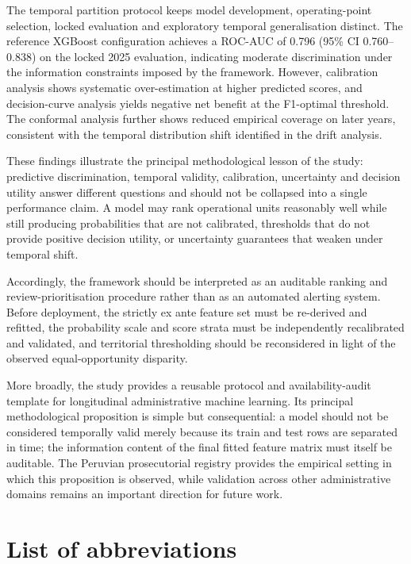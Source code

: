 \documentclass[sn-vancouver,Numbered]{sn-jnl}
\begin{document}
The temporal partition protocol keeps model development, operating-point selection, locked evaluation and exploratory temporal generalisation distinct. The reference XGBoost configuration achieves a ROC-AUC of 0.796 (95\% CI 0.760--0.838) on the locked 2025 evaluation, indicating moderate discrimination under the information constraints imposed by the framework. However, calibration analysis shows systematic over-estimation at higher predicted scores, and decision-curve analysis yields negative net benefit at the F1-optimal threshold. The conformal analysis further shows reduced empirical coverage on later years, consistent with the temporal distribution shift identified in the drift analysis.

These findings illustrate the principal methodological lesson of the study: predictive discrimination, temporal validity, calibration, uncertainty and decision utility answer different questions and should not be collapsed into a single performance claim. A model may rank operational units reasonably well while still producing probabilities that are not calibrated, thresholds that do not provide positive decision utility, or uncertainty guarantees that weaken under temporal shift.

Accordingly, the framework should be interpreted as an auditable ranking and review-prioritisation procedure rather than as an automated alerting system. Before deployment, the strictly ex ante feature set must be re-derived and refitted, the probability scale and score strata must be independently recalibrated and validated, and territorial thresholding should be reconsidered in light of the observed equal-opportunity disparity.

More broadly, the study provides a reusable protocol and availability-audit template for longitudinal administrative machine learning. Its principal methodological proposition is simple but consequential: a model should not be considered temporally valid merely because its train and test rows are separated in time; the information content of the final fitted feature matrix must itself be auditable. The Peruvian prosecutorial registry provides the empirical setting in which this proposition is observed, while validation across other administrative domains remains an important direction for future work.

\backmatter

\section*{List of abbreviations}
\end{document}
